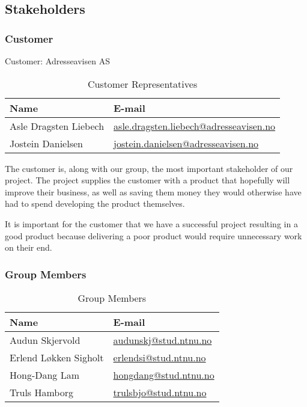 \subsection{Stakeholders}
\subsubsection{Customer}
Customer: Adresseavisen AS

\begin{table}[H]
\begin{tabular}{|l|l|}
\hline
\textbf{Name} & \textbf{E-mail} \\
\hline
Asle Dragsten Liebech & \href{mailto://asle.dragsten.liebech@adresseavisen.no}{asle.dragsten.liebech@adresseavisen.no}\\
Jostein Danielsen & \href{mailto://jostein.danielsen@adresseavisen.no}{jostein.danielsen@adresseavisen.no}\\
\hline
\end{tabular}
\caption{Customer Representatives}
\end{table}

The customer is, along with our group, the most important stakeholder of our project. The project supplies the customer with a product that hopefully will improve their business, as well as saving them money they would otherwise have had to spend developing the product themselves.

It is important for the customer that we have a successful project resulting in a good product because delivering a poor product would require unnecessary work on their end.
\subsubsection{Group Members}
\begin{table}[H]
\begin{tabular}{|p{5cm}|p{6cm}|}
\hline
\textbf{Name} & \textbf{E-mail} \\
\hline
Audun Skjervold & \href{mailto://audunskj@stud.ntnu.no}{audunskj@stud.ntnu.no}\\
Erlend Løkken Sigholt & \href{mailto://erlendsi@stud.ntnu.no}{erlendsi@stud.ntnu.no}\\
Hong-Dang Lam & \href{mailto://hongdang@stud.ntnu.no}{hongdang@stud.ntnu.no}\\
Truls Hamborg & \href{mailto://trulsbjo@stud.ntnu.no}{trulsbjo@stud.ntnu.no}\\
\hline
\end{tabular}
\caption{Group Members}
\end{table}

